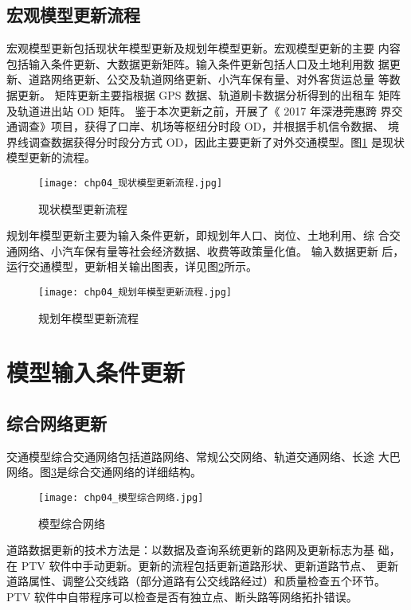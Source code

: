 \subsection{宏观模型更新流程}
宏观模型更新包括现状年模型更新及规划年模型更新。宏观模型更新的主要
内容包括输入条件更新、大数据更新矩阵。输入条件更新包括人口及土地利用数
据更新、道路网络更新、公交及轨道网络更新、小汽车保有量、对外客货运总量
等数据更新。 矩阵更新主要指根据 GPS 数据、轨道刷卡数据分析得到的出租车
矩阵及轨道进出站 OD 矩阵。 鉴于本次更新之前，开展了《 2017 年深港莞惠跨
界交通调查》项目，获得了口岸、机场等枢纽分时段 OD，并根据手机信令数据、
境界线调查数据获得分时段分方式 OD，因此主要更新了对外交通模型。图\ref{fig:chp04_现状模型更新流程}
是现状模型更新的流程。

\begin{figure}[!ht]
  \centering
  \texttt{[image: chp04\_现状模型更新流程.jpg]}
  \caption{现状模型更新流程\label{fig:chp04_现状模型更新流程} }
\end{figure}

规划年模型更新主要为输入条件更新，即规划年人口、岗位、土地利用、综
合交通网络、小汽车保有量等社会经济数据、收费等政策量化值。 输入数据更新
后，运行交通模型，更新相关输出图表，详见图\ref{fig:chp04_规划年模型更新流程}所示。

\begin{figure}[!ht]
  \centering
  \texttt{[image: chp04\_规划年模型更新流程.jpg]}
  \caption{规划年模型更新流程\label{fig:chp04_规划年模型更新流程} }
\end{figure}

\section{模型输入条件更新}
\subsection{综合网络更新}
交通模型综合交通网络包括道路网络、常规公交网络、轨道交通网络、长途
大巴网络。图\ref{fig:chp04_模型综合网络}是综合交通网络的详细结构。

\begin{figure}[!ht]
  \centering
  \texttt{[image: chp04\_模型综合网络.jpg]}
  \caption{模型综合网络\label{fig:chp04_模型综合网络} }
\end{figure}

道路数据更新的技术方法是：以数据及查询系统更新的路网及更新标志为基
础，在 PTV 软件中手动更新。更新的流程包括更新道路形状、更新道路节点、
更新道路属性、调整公交线路（部分道路有公交线路经过）和质量检查五个环节。
PTV 软件中自带程序可以检查是否有独立点、断头路等网络拓扑错误。

